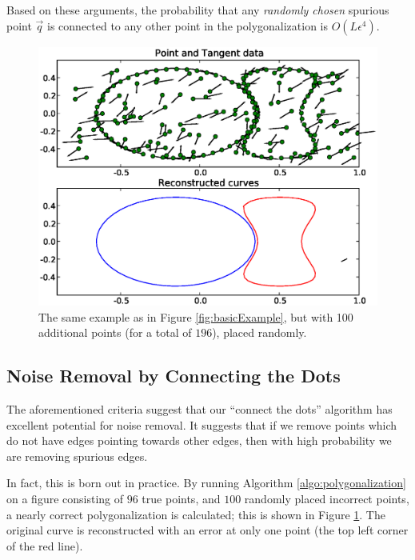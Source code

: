 \documentclass{article}
\numberwithin{cntr}{section}
\numberwithin{equation}{section}
\newcommand{\vq}[0]{{\vec{q}}}
\begin{document}
Based on these arguments, the probability that any \emph{randomly chosen} spurious point $\vq$ is connected to any other point in the polygonalization is $O(L \epsilon^{4})$.

\begin{figure}
\setlength{\unitlength}{0.240900pt}
\ifx\plotpoint\undefined\newsavebox{\plotpoint}\fi
\sbox{\plotpoint}{\rule[-0.200pt]{0.400pt}{0.400pt}}%
\includegraphics[scale=0.5]{noisy_example.eps}

\caption{The same example as in Figure \ref{fig:basicExample}, but with 100 additional points (for a total of $196$), placed randomly. }
\label{fig:noisyExample}
\end{figure}

\subsection{Noise Removal by Connecting the Dots}

The aforementioned criteria suggest that our ``connect the dots'' algorithm has excellent potential for noise removal. It suggests that if we remove points which do not have edges pointing towards other edges, then with high probability we are removing spurious edges.

In fact, this is born out in practice. By running Algorithm \ref{algo:polygonalization} on a figure consisting of $96$ true points, and $100$ randomly placed incorrect points, a nearly correct polygonalization is calculated; this is shown in Figure \ref{fig:noisyExample}. The original curve is reconstructed with an error at only one point (the top left corner of the red line).
\end{document}
